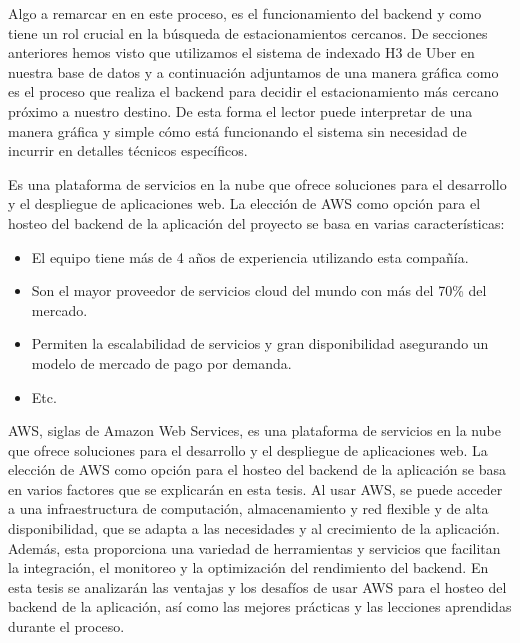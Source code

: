 Algo a remarcar en en este proceso, es el funcionamiento del backend y como tiene un rol crucial en la búsqueda de estacionamientos cercanos. De secciones anteriores hemos visto que utilizamos el sistema de indexado H3 de Uber en nuestra base de datos y a continuación adjuntamos de una manera gráfica como es el proceso que realiza el backend para decidir el estacionamiento más cercano próximo a nuestro destino. De esta forma el lector puede interpretar de una manera gráfica y simple cómo está funcionando el sistema sin necesidad de incurrir en detalles técnicos específicos.



Es una plataforma de servicios en la nube que ofrece soluciones para el desarrollo y el despliegue de aplicaciones web. La elección de AWS como opción para el hosteo del backend de la aplicación del proyecto se basa en varias características: 

\begin{itemize}
    \item El equipo tiene más de 4 años de experiencia utilizando esta compañía.
    \item Son el mayor proveedor de servicios cloud del mundo con más del 70\% del mercado.
    \item Permiten la escalabilidad de servicios y gran disponibilidad asegurando un modelo de mercado de pago por demanda.
    \item Etc.
\end{itemize}

AWS, siglas de Amazon Web Services, es una plataforma de servicios en la nube que ofrece soluciones para el desarrollo y el despliegue de aplicaciones web. La elección de AWS como opción para el hosteo del backend de la aplicación se basa en varios factores que se explicarán en esta tesis. Al usar AWS, se puede acceder a una infraestructura de computación, almacenamiento y red flexible y de alta disponibilidad, que se adapta a las necesidades y al crecimiento de la aplicación. Además, esta proporciona una variedad de herramientas y servicios que facilitan la integración, el monitoreo y la optimización del rendimiento del backend. En esta tesis se analizarán las ventajas y los desafíos de usar AWS para el hosteo del backend de la aplicación, así como las mejores prácticas y las lecciones aprendidas durante el proceso.
